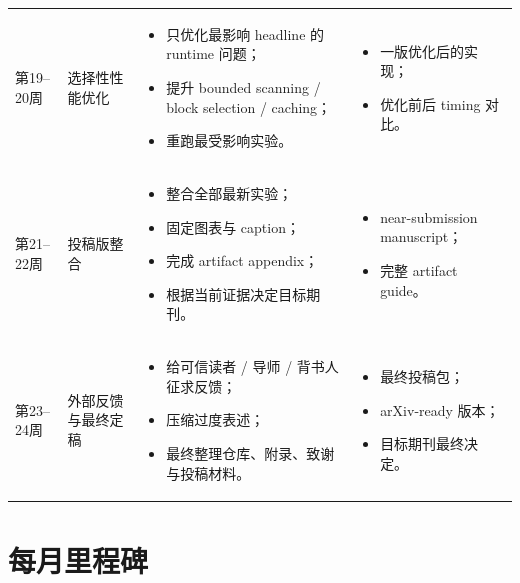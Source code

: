 \documentclass[11pt]{article}
\begin{document}
\begin{longtable}{p{} p{} p{} p{}}
第19--20周 &
选择性性能优化 &
\begin{itemize}
    \item 只优化最影响 headline 的 runtime 问题；
    \item 提升 bounded scanning / block selection / caching；
    \item 重跑最受影响实验。
\end{itemize}
&
\begin{itemize}
    \item 一版优化后的实现；
    \item 优化前后 timing 对比。
\end{itemize}
\\

第21--22周 &
投稿版整合 &
\begin{itemize}
    \item 整合全部最新实验；
    \item 固定图表与 caption；
    \item 完成 artifact appendix；
    \item 根据当前证据决定目标期刊。
\end{itemize}
&
\begin{itemize}
    \item near-submission manuscript；
    \item 完整 artifact guide。
\end{itemize}
\\

第23--24周 &
外部反馈与最终定稿 &
\begin{itemize}
    \item 给可信读者 / 导师 / 背书人征求反馈；
    \item 压缩过度表述；
    \item 最终整理仓库、附录、致谢与投稿材料。
\end{itemize}
&
\begin{itemize}
    \item 最终投稿包；
    \item arXiv-ready 版本；
    \item 目标期刊最终决定。
\end{itemize}
\\

\bottomrule
\end{longtable}

\section{每月里程碑}
\end{document}
